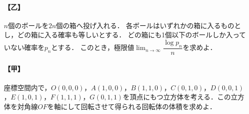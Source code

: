 \documentclass[../../main.tex]{subfiles}
\begin{document}
\paragraph{【乙】}
$n$個のボールを$2n$個の箱へ投げ入れる．
各ボールはいずれかの箱に入るものとし，どの箱に入る確率も等しいとする．
どの箱にも1個以下のボールしか入っていない確率を$p_n$とする．
このとき，極限値$\displaystyle\lim_{n\to\infty}\dfrac{\log p_n}{n}$を求めよ．

\paragraph{【甲】}
座標空間内で，$O(0,0,0)$，$A(1,0,0)$，$B(1,1,0)$，$C(0,1,0)$，$D(0,0,1)$，$E(1,0,1)$，$F(1,1,1)$，$G(0,1,1)$を頂点にもつ立方体を考える．この立方体を対角線$OF$を軸にして回転させて得られる回転体の体積を求めよ．
\end{document}
